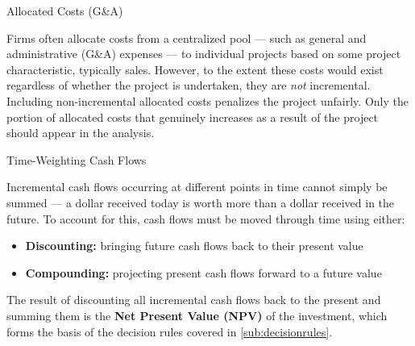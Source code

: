 \documentclass[10pt]{article}
\begin{document}
    \begin{core}{Allocated Costs (G\&A)}

      Firms often allocate costs from a centralized pool — such as general and administrative (G\&A) expenses — to individual projects based on some project characteristic, typically sales. However, to the extent these costs would exist regardless of whether the project is undertaken, they are \textit{not} incremental. Including non-incremental allocated costs penalizes the project unfairly. Only the portion of allocated costs that genuinely increases as a result of the project should appear in the analysis.


    \end{core}

    \begin{core}{Time-Weighting Cash Flows}

      Incremental cash flows occurring at different points in time cannot simply be summed — a dollar received today is worth more than a dollar received in the future. To account for this, cash flows must be moved through time using either:

      \begin{itemize}

        \item \textbf{Discounting:} bringing future cash flows back to their present value

        \item \textbf{Compounding:} projecting present cash flows forward to a future value

      \end{itemize}

      The result of discounting all incremental cash flows back to the present and summing them is the \textbf{Net Present Value (NPV)} of the investment, which forms the basis of the decision rules covered in \autoref{sub:decisionrules}.


    \end{core}
\end{document}
